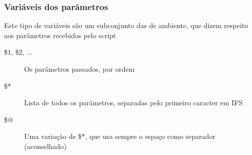 \documentclass[t,notes=show]{beamer}
\begin{document}
	\begin{frame}
		\frametitle{Variáveis dos parâmetros}
		
		Este tipo de variáveis são um subconjunto das de ambiente, que dizem respeito aos parâmetros recebidos pelo script

		\begin{description}
			\item[\$1, \$2, ...] Os parâmetros passados, por ordem
			\item[\$*] Lista de todos os parâmetros, separadas pelo primeiro caracter em IFS
			\item[\$@] Uma variação de \$*, que usa sempre o espaço como separador (aconselhado)
		\end{description}
		
	\end{frame}	
		
\end{document}
